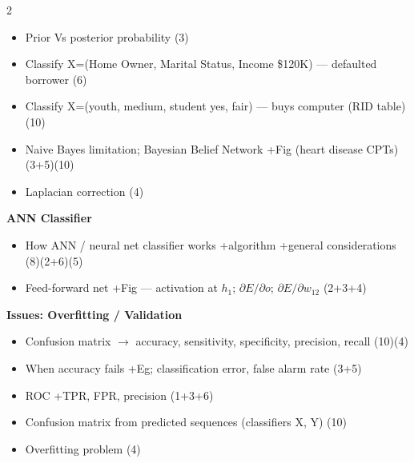 \documentclass[10pt]{article}
\begin{document}
\begin{multicols}{2}
\begin{itemize}
  \item Prior Vs posterior probability \hfill (3)
  \item Classify X=(Home Owner, Marital Status, Income \$120K) --- defaulted borrower \hfill (6)
  \item Classify X=(youth, medium, student yes, fair) --- buys computer (RID table) \hfill (10)
  \item Naive Bayes limitation; Bayesian Belief Network +Fig (heart disease CPTs) \hfill (3+5)(10)
  \item Laplacian correction \hfill (4)
\end{itemize}
\textbf{ANN Classifier}
\begin{itemize}
  \item How ANN / neural net classifier works +algorithm +general considerations \hfill (8)(2+6)(5)
  \item Feed-forward net +Fig --- activation at $h_1$; $\partial E/\partial o$; $\partial E/\partial w_{12}$ \hfill (2+3+4)
\end{itemize}
\textbf{Issues: Overfitting / Validation}
\begin{itemize}
  \item Confusion matrix $\to$ accuracy, sensitivity, specificity, precision, recall \hfill (10)(4)
  \item When accuracy fails +Eg; classification error, false alarm rate \hfill (3+5)
  \item ROC +TPR, FPR, precision \hfill (1+3+6)
  \item Confusion matrix from predicted sequences (classifiers X, Y) \hfill (10)
  \item Overfitting problem \hfill (4)
\end{itemize}


\end{multicols}
\end{document}

